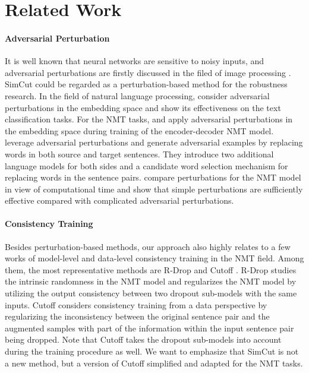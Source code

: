 \documentclass[11pt]{article}
\begin{document}
\section{Related Work}

\paragraph{Adversarial Perturbation}

It is well known that neural networks are sensitive to noisy inputs, and adversarial perturbations are firstly discussed in the filed of image processing \cite{szegedy2013intriguing, goodfellow2014explaining}. SimCut could be regarded as a perturbation-based method for the robustness research. In the field of natural language processing, \citet{miyato2016adversarial} consider adversarial perturbations in the embedding space and show its effectiveness on the text classification tasks. For the NMT tasks, \citet{sano2019effective} and \citet{wang2019improving} apply adversarial perturbations in the embedding space during training of the encoder-decoder NMT model. \citet{cheng2019robust} leverage adversarial perturbations and generate adversarial examples by replacing words in both source and target sentences. They introduce two additional language models for both sides and a candidate word selection mechanism for replacing words in the sentence pairs. \citet{takase2021rethinking} compare perturbations for the NMT model in view of computational time and show that simple perturbations are sufficiently effective compared with complicated adversarial perturbations.

\paragraph{Consistency Training}

Besides perturbation-based methods, our approach also highly relates to a few works of model-level and data-level consistency training in the NMT field. Among them, the most representative methods are R-Drop \cite{liang2021r} and Cutoff \cite{shen2020simple}. R-Drop studies the intrinsic randomness in the NMT model and regularizes the NMT model by utilizing the output consistency between two dropout sub-models with the same inputs. Cutoff considers consistency training from a data perspective by regularizing the inconsistency between the original sentence pair and the augmented samples with part of the information within the input sentence pair being dropped. Note that Cutoff takes the dropout sub-models into account during the training procedure as well. We want to emphasize that SimCut is not a new method, but a version of Cutoff simplified and adapted for the NMT tasks.
\end{document}
